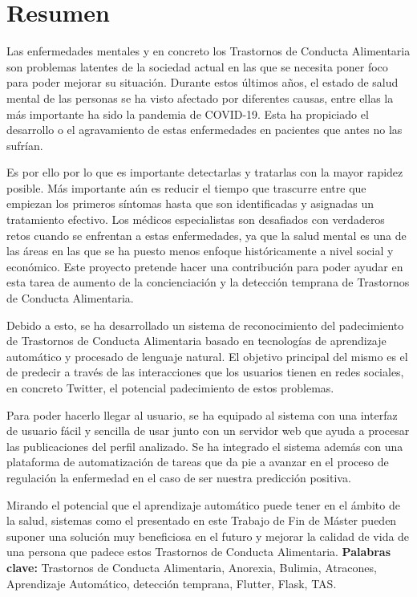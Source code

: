\cleardoublepage
{}
\chapter*{Resumen}

Las enfermedades mentales y en concreto los Trastornos de Conducta Alimentaria son problemas latentes de la sociedad actual en las que se necesita poner foco para poder mejorar su situación. Durante estos últimos años, el estado de salud mental de las personas se ha visto afectado por diferentes causas, entre ellas la más importante ha sido la pandemia de COVID-19. Esta ha propiciado el desarrollo o el agravamiento de estas enfermedades en pacientes que antes no las sufrían.

Es por ello por lo que es importante detectarlas y tratarlas con la mayor rapidez posible. Más importante aún es reducir el tiempo que trascurre entre que empiezan los primeros síntomas hasta que son identificadas y asignadas un tratamiento efectivo. Los médicos especialistas son desafiados con verdaderos retos cuando se enfrentan a estas enfermedades, ya que la salud mental es una de las áreas en las que se ha puesto menos enfoque históricamente a nivel social y económico. Este proyecto pretende hacer una contribución para poder ayudar en esta tarea de aumento de la concienciación y la detección temprana de Trastornos de Conducta Alimentaria.

Debido a esto, se ha desarrollado un sistema de reconocimiento del padecimiento de Trastornos de Conducta Alimentaria basado en tecnologías de aprendizaje automático y procesado de lenguaje natural. El objetivo principal del mismo es el de predecir a través de las interacciones que los usuarios tienen en redes sociales, en concreto Twitter, el potencial padecimiento de estos problemas.

Para poder hacerlo llegar al usuario, se ha equipado al sistema con una interfaz de usuario fácil y sencilla de usar junto con un servidor web que ayuda a procesar las publicaciones del perfil analizado. Se ha integrado el sistema además con una plataforma de automatización de tareas que da pie a avanzar en el proceso de regulación la enfermedad en el caso de ser nuestra predicción positiva.

Mirando el potencial que el aprendizaje automático puede tener en el ámbito de la salud, sistemas como el presentado en este Trabajo de Fin de Máster pueden suponer una solución muy beneficiosa en el futuro y mejorar la calidad de vida de una persona que padece estos Trastornos de Conducta Alimentaria.
\vfill
\textbf{Palabras clave:} Trastornos de Conducta Alimentaria, Anorexia, Bulimia, Atracones, Aprendizaje Automático, detección temprana, Flutter, Flask, TAS.